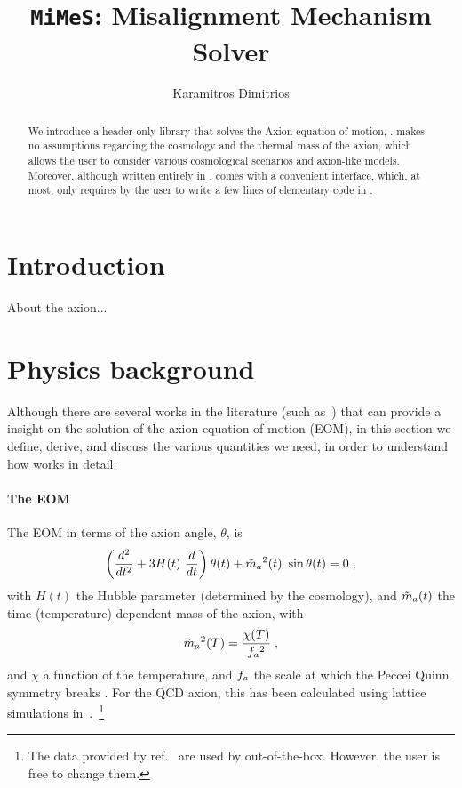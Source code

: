\documentclass[11pt,a4paper]{article}
\author{Karamitros Dimitrios}
\title{{\tt MiMeS}: Misalignment Mechanism Solver}
\begin{document}
\maketitle

\begin{abstract}
	We introduce a \CPP header-only library that solves the Axion equation of motion, \mimes.  
	\mimes makes no assumptions regarding the cosmology and the thermal mass of the axion, which allows the user 
	to consider various cosmological scenarios and axion-like models.
	Moreover, although written entirely in \CPP, \mimes comes with a convenient \PY interface, which, at most, 
	only requires by the user to write a few lines of elementary code in \CPP.
\end{abstract}


\section{Introduction}\label{sec:intro}
\setcounter{equation}{0}

About the axion...

\section{Physics background}\label{sec:abundance}
\setcounter{equation}{0}
%
Although there are several works in the literature (such as~\cite{Chang:1998ys}) that can provide a insight on the solution of the axion equation of motion (EOM), in this section we define, derive, and discuss the various quantities we need, in order to understand how \mimes works in detail.

\paragraph{The EOM} %
%
%
The EOM in terms of the axion angle, $\theta$, is 
%
\begin{equation}
	\lrb{\dfrac{d^2}{d t^2} + 3 H(t) \ \dfrac{d}{d t} } \theta(t) + \maT^2(t) \ \sin \theta(t) = 0 \; ,
	\label{eq:eom}
\end{equation}
%
with $H(t)$ the Hubble parameter (determined by the cosmology), and $\tilde m_{a}{}(t)$  the time (temperature) dependent mass of the axion, with 
\begin{equation}
	\tilde m_{a}{}^2(T) = \dfrac{\chi(T)}{f_{a}{}^2}\;,
	\label{eq:axion_mass_def}
\end{equation} 
%
and $\chi$ a function of the temperature, and $f_{a}{}$ the scale at which the Peccei Quinn symmetry breaks . For the QCD axion, this has been calculated using lattice simulations in~\cite{Borsanyi:2016ksw}.~\footnote{The data provided by ref.~\cite{Borsanyi:2016ksw} are used by  \mimes out-of-the-box. However, the user is free to change them.}
\end{document}
